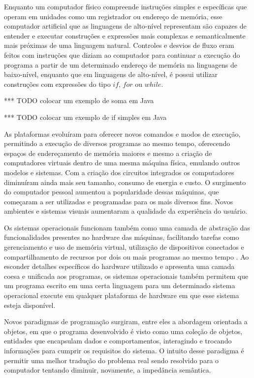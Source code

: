\documentclass[11pt,twoside,a4paper]{book}
\begin{document}
Enquanto um computador físico compreende instruções simples e específicas que operam em unidades como um registrador ou endereço de memória, esse computador artificial que as linguagens de alto-nível representam são capazes de entender e executar construções e expressões mais complexas e semanticalmente mais próximas de uma linguagem natural. Controles e desvios de fluxo eram feitos com instruções que diziam ao computador para continuar a execução do programa a partir de um determinado endereço de memória na linguagens de baixo-nível, enquanto que em linguagens de alto-nível, é possui utilizar construções com expressões do tipo $if$, $for$ ou $while$.

*** TODO colocar um exemplo de soma em Java

*** TODO colocar um exemplo de if simples em Java

As plataformas evoluíram para oferecer novos comandos e modos de execução, permitindo a execução de diversos programas ao mesmo tempo, oferecendo espaços de endereçamento de memória maiores e mesmo a criação de computadores virtuais dentro de uma mesma máquina física, emulando outros modelos e sistemas. Com a criação dos circuitos integrados os computadores diminuíram ainda mais seu tamanho, consumo de energia e custo. O surgimento do computador pessoal aumentou a popularidade dessas máquinas, que começaram a ser utilizadas e programadas para os mais diversos fins. Novos ambientes e sistemas visuais aumentaram a qualidade da experiência do usuário.

Os sistemas operacionais funcionam também como uma camada de abstração das funcionalidades presentes no hardware das máquinas, facilitando tarefas como gerenciamento e uso de memória virtual, utilização de dispositivos conectados e compartilhamento de recursos por dois ou mais programas ao mesmo tempo \cite{so}. Ao esconder detalhes específicos do hardware utilizado e apresenta uma camada coesa e unificada aos programas, os sistemas operacionais também permitem que um programa escrito em uma certa linguagem para um determinado sistema operacional execute em qualquer plataforma de hardware em que esse sistema esteja disponível. 

Novos paradigmas de programação surgiram, entre eles a abordagem orientada a objetos, em que o programa desenvolvido é visto como uma coleção de objetos, entidades que encapsulam dados e comportamentos, interagindo e trocando informações para cumprir os requisitos do sistema. O intuito desse paradigma é permitir uma melhor tradução do problema real sendo resolvido para o computador tentando diminuir, novamente, a impedância semântica.
\end{document}
